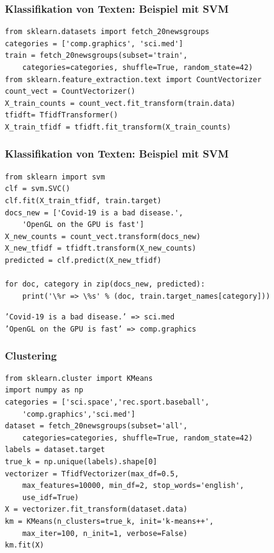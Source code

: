 \begin{frame}[fragile]
    \frametitle{Klassifikation von Texten: Beispiel mit SVM}
    
    \begin{verbatim}
from sklearn.datasets import fetch_20newsgroups
categories = ['comp.graphics', 'sci.med']
train = fetch_20newsgroups(subset='train',
    categories=categories, shuffle=True, random_state=42)
from sklearn.feature_extraction.text import CountVectorizer
count_vect = CountVectorizer()
X_train_counts = count_vect.fit_transform(train.data)
tfidft= TfidfTransformer()
X_train_tfidf = tfidft.fit_transform(X_train_counts)
    \end{verbatim}
\end{frame}
    
    
\begin{frame}[fragile]
    \frametitle{Klassifikation von Texten: Beispiel mit SVM}
    
    \begin{verbatim}
from sklearn import svm
clf = svm.SVC()
clf.fit(X_train_tfidf, train.target)
docs_new = ['Covid-19 is a bad disease.', 
    'OpenGL on the GPU is fast']
X_new_counts = count_vect.transform(docs_new)
X_new_tfidf = tfidft.transform(X_new_counts)
predicted = clf.predict(X_new_tfidf)

for doc, category in zip(docs_new, predicted):
    print('\%r => \%s' % (doc, train.target_names[category]))
    \end{verbatim}
    
    \texttt{'Covid-19 is a bad disease.' => sci.med}\\
    \texttt{'OpenGL on the GPU is fast' => comp.graphics}
    
\end{frame}
    

\begin{frame}[fragile]
    \frametitle{Clustering}

    \begin{verbatim}
from sklearn.cluster import KMeans
import numpy as np
categories = ['sci.space','rec.sport.baseball',
    'comp.graphics','sci.med']
dataset = fetch_20newsgroups(subset='all', 
    categories=categories, shuffle=True, random_state=42)
labels = dataset.target
true_k = np.unique(labels).shape[0]
vectorizer = TfidfVectorizer(max_df=0.5,
    max_features=10000, min_df=2, stop_words='english', 
    use_idf=True)
X = vectorizer.fit_transform(dataset.data)
km = KMeans(n_clusters=true_k, init='k-means++',
    max_iter=100, n_init=1, verbose=False)
km.fit(X)
    \end{verbatim}
\end{frame}
    
